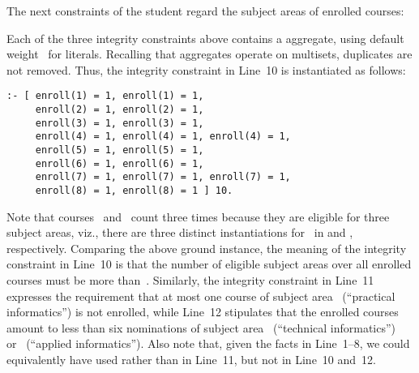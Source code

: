 \begin{example}
The next constraints of the student regard the subject areas of enrolled courses:
%

%
Each of the three integrity constraints above contains a  aggregate,
using default weight~ for literals.
Recalling that  aggregates operate on multisets,
duplicates are not removed.
Thus, the integrity constraint in Line~10 is instantiated as follows:
%
\begin{lstlisting}[firstnumber=10,stepnumber=10]
:- [ enroll(1) = 1, enroll(1) = 1, 
     enroll(2) = 1, enroll(2) = 1,
     enroll(3) = 1, enroll(3) = 1,
     enroll(4) = 1, enroll(4) = 1, enroll(4) = 1,
     enroll(5) = 1, enroll(5) = 1,
     enroll(6) = 1, enroll(6) = 1,
     enroll(7) = 1, enroll(7) = 1, enroll(7) = 1,
     enroll(8) = 1, enroll(8) = 1 ] 10.
\end{lstlisting}
%
Note that courses~ and~ count three times because
they are eligible for three subject areas, viz., there are three
distinct instantiations for~ in
 and
, respectively.
Comparing the above ground instance,
the meaning of the integrity constraint in Line~10 is that the 
number of eligible subject areas over all enrolled courses
must be more than~.
Similarly, the integrity constraint in Line~11 expresses the requirement
that at most one course of subject area~ (``practical informatics'')
is not enrolled,
while Line~12 stipulates that the enrolled courses
amount to less than six nominations of
subject area~ (``technical informatics'') 
or~ (``applied informatics'').
Also note that, given the facts in Line~1--8,
we could equivalently have used  rather than  in Line~11,
but not in Line~10 and~12.


\end{example}
